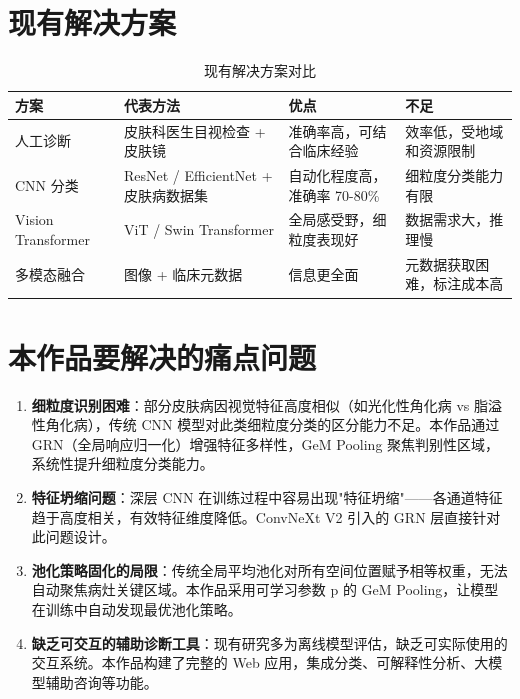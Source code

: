 \documentclass[12pt,a4paper]{report}
\begin{document}
\section{现有解决方案}

\begin{table}[H]
    \centering
    \caption{现有解决方案对比}
    \label{tab:solutions}
    \begin{tabularx}{\textwidth}{l X X X}
        \toprule
        \textbf{方案} & \textbf{代表方法} & \textbf{优点} & \textbf{不足} \\
        \midrule
        人工诊断 & 皮肤科医生目视检查 + 皮肤镜 & 准确率高，可结合临床经验 & 效率低，受地域和资源限制 \\
        CNN 分类 & ResNet / EfficientNet + 皮肤病数据集 & 自动化程度高，准确率 70-80\% & 细粒度分类能力有限 \\
        Vision Transformer & ViT / Swin Transformer & 全局感受野，细粒度表现好 & 数据需求大，推理慢 \\
        多模态融合 & 图像 + 临床元数据 & 信息更全面 & 元数据获取困难，标注成本高 \\
        \bottomrule
    \end{tabularx}
\end{table}

\section{本作品要解决的痛点问题}

\begin{enumerate}[leftmargin=2em, itemsep=0.5em]
    \item \textbf{细粒度识别困难}：部分皮肤病因视觉特征高度相似（如光化性角化病 vs 脂溢性角化病），传统 CNN 模型对此类细粒度分类的区分能力不足。本作品通过 GRN（全局响应归一化）增强特征多样性，GeM Pooling 聚焦判别性区域，系统性提升细粒度分类能力。
    
    \item \textbf{特征坍缩问题}：深层 CNN 在训练过程中容易出现"特征坍缩"——各通道特征趋于高度相关，有效特征维度降低。ConvNeXt V2 引入的 GRN 层直接针对此问题设计。
    
    \item \textbf{池化策略固化的局限}：传统全局平均池化对所有空间位置赋予相等权重，无法自动聚焦病灶关键区域。本作品采用可学习参数 p 的 GeM Pooling，让模型在训练中自动发现最优池化策略。
    
    \item \textbf{缺乏可交互的辅助诊断工具}：现有研究多为离线模型评估，缺乏可实际使用的交互系统。本作品构建了完整的 Web 应用，集成分类、可解释性分析、大模型辅助咨询等功能。
\end{enumerate}
\end{document}
